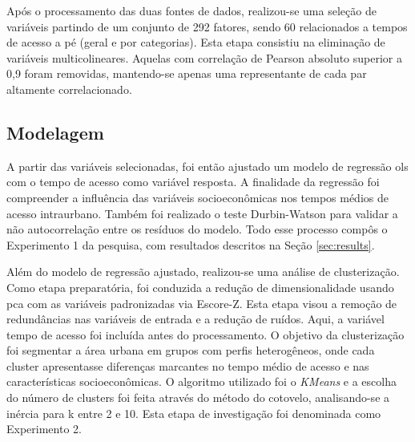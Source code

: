 Após o processamento das duas fontes de dados, realizou-se uma seleção de variáveis partindo de um conjunto de 292 fatores, sendo 60 relacionados a tempos de acesso a pé (geral e por categorias). Esta etapa consistiu na eliminação de variáveis multicolineares. Aquelas com correlação de Pearson absoluto superior a 0,9 foram removidas, mantendo-se apenas uma representante de cada par altamente correlacionado. 

\subsection{Modelagem}

A partir das variáveis selecionadas, foi então ajustado um modelo de regressão \ac{ols} com o tempo de acesso como variável resposta. A finalidade da regressão foi compreender a influência das variáveis socioeconômicas nos tempos médios de acesso intraurbano. Também foi realizado o teste Durbin-Watson para validar a não autocorrelação entre os resíduos do modelo. Todo esse processo compôs o Experimento 1 da pesquisa, com resultados descritos na Seção \ref{sec:results}.

Além do modelo de regressão ajustado, realizou-se uma análise de clusterização. Como etapa preparatória, foi conduzida a redução de dimensionalidade usando \ac{pca} com as variáveis padronizadas via Escore-Z. Esta etapa visou a remoção de redundâncias nas variáveis de entrada e a redução de ruídos. Aqui, a variável tempo de acesso foi incluída antes do processamento. O objetivo da clusterização foi segmentar a área urbana em grupos com perfis heterogêneos, onde cada cluster apresentasse diferenças marcantes no tempo médio de acesso e nas características socioeconômicas. O algoritmo utilizado foi o \textit{KMeans} e a escolha do número de clusters foi feita através do método do cotovelo, analisando-se a inércia para k entre 2 e 10. Esta etapa de investigação foi denominada como Experimento 2.